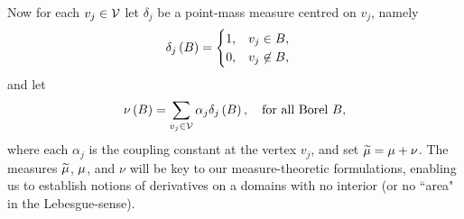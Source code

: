 Now for each $v_j\in\mathcal{V}$ let $\delta_j$ be a point-mass measure centred on $v_j$, namely
\begin{align*}
	\delta_j\left( B \right) &= \begin{cases} 1, & v_j\in B, \\ 0, & v_j\not\in B, \end{cases}
\end{align*}
and let
\begin{align*}
	\nu\left( B \right) = \sum_{v_j\in\mathcal{V}}\alpha_j\delta_j\left( B \right),
	\quad\text{for all Borel } B,
\end{align*}
where each $\alpha_j$ is the coupling constant at the vertex $v_j$, and set $\widetilde{\mu} = \mu + \nu$.
The measures $\widetilde{\mu}$, $\mu$, and $\nu$ will be key to our measure-theoretic formulations, enabling us to establish notions of derivatives on a domains with no interior (or no ``area" in the Lebesgue-sense).

